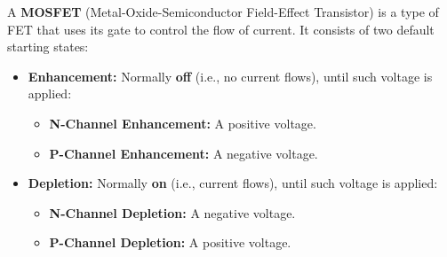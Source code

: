 \begin{Def}

    \label{def:mosfet_overview}
    \noindent
    A \textbf{MOSFET} (Metal-Oxide-Semiconductor Field-Effect Transistor) is a type of FET that uses its gate to control the flow of current.
    It consists of two default starting states:
    \begin{itemize}
      \item \textbf{Enhancement:} Normally \textbf{off} (i.e., no current flows), until such voltage is applied:
      \begin{itemize}
        \item \textbf{N-Channel Enhancement:} A positive voltage.
        \item \textbf{P-Channel Enhancement:} A negative voltage.
      \end{itemize}
      \item \textbf{Depletion:} Normally \textbf{on} (i.e., current flows), until such voltage is applied:
      \begin{itemize}
        \item \textbf{N-Channel Depletion:} A negative voltage.
        \item \textbf{P-Channel Depletion:} A positive voltage.
        \end{itemize}
    \end{itemize}
  \end{Def}

\newpage 

